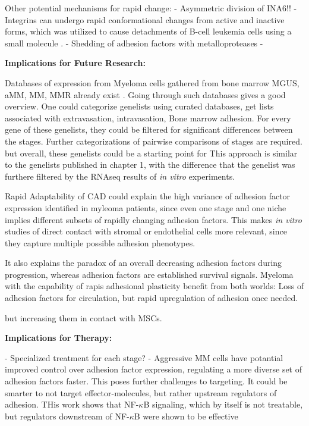 Other potential mechanisms for rapid change:
- Asymmetric division of INA6!!
- Integrins can undergo rapid conformational changes from active and inactive
forms, which was utilized to cause detachments of B-cell leukemia cells
using a small molecule \cite{ruanVitroVivoEffects2022}.
- Shedding of adhesion factors with metalloproteases
-



\textbf{Implications for Future Research:}


Databases of expression from Myeloma cells gathered from bone
marrow \ac{MGUS}, \ac{aMM}, \ac{MM}, \ac{MMR} already exist
\citet{akhmetzyanovaDynamicCD138Surface2020,
      seckingerCD38ImmunotherapeuticTarget2018}. Going through such databases gives a
good overview. One could categorize genelists using curated databases, get lists
associated with extravasation, intravasation, Bone marrow adhesion. For every
gene of these genelists, they could be filtered for significant differences
between the stages. Further categorizations of pairwise comparisons of stages
are required. but overall, these genelists could be a starting point for This
approach is similar to the genelists published in chapter 1, with the difference
that the genelist was furthere filtered by the RNAseq results of \textit{in
      vitro} experiments.


Rapid Adaptability of \ac{CAD} could explain the high variance of adhesion
factor expression identified in myleoma patients, since even one stage and one
niche implies different subsets of rapidly changing adhesion factors. This makes
\textit{in vitro} studies of direct contact with stromal or endothelial cells
more relevant, since they capture multiple possible adhesion phenotypes.

It also explains the paradox of an overall decreasing adhesion factors during
progression, whereas adhesion factors are established survival signals. Myeloma
with the capability of rapis adhesional plasticity benefit from both worlds:
Loss of adhesion factors for circulation, but rapid upregulation of adhesion
once needed.

but increasing them in contact with \acp{MSC}.


\textbf{Implications for Therapy:}

- Specialized treatment for each stage?
- Aggressive MM cells have potantial improved control over adhesion factor
expression, regulating a more diverse set of adhesion factors faster. This poses
further challenges to targeting. It could be smarter to not target
effector-molecules, but rather upstream regulators of adhesion. THis work shows
that NF-$\kappa$B signaling, which by itself is not treatable, but regulators
downstream of NF-$\kappa$B were shown to be effective
\cite{adamikEZH2HDAC1Inhibition2017, adamikXRK3F2InhibitionP62ZZ2018}



